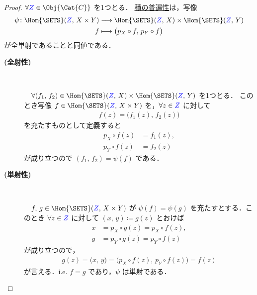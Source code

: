 \documentclass[geometry_main]{subfiles}
\begin{document}
\begin{proof}
	$\forall  \textcolor{blue}{Z} \in \Obj{\Cat{C}}$ を1つとる．
	\hyperref[def:product]{積の普遍性}は，写像
	\begin{align}
		\psi \colon \Hom{\SETS}(\textcolor{blue}{Z},\, X \times Y) &\lto \Hom{\SETS}(\textcolor{blue}{Z},\, X) \times \Hom{\SETS}(\textcolor{blue}{Z},\, Y) \\
		f &\lmto \bigl( p_X \circ f,\, p_Y \circ f \bigr) \label{eq:univ-product}
	\end{align}
	が全単射であることと同値である．
	\begin{description}
		\item[\textbf{(全射性)}] 　
		
		　$\forall (f_1,\, f_2) \in \Hom{\SETS}(\textcolor{blue}{Z},\, X) \times \Hom{\SETS}(\textcolor{blue}{Z},\, Y)$ を1つとる．
		このとき写像 $f \in \Hom{\SETS}(\textcolor{blue}{Z},\, X \times Y)$ を，$\forall z \in \textcolor{blue}{Z}$ に対して
		\begin{align}
			f(z) = \bigl( f_1(z),\, f_2(z) \bigr) 
		\end{align}
		を充たすものとして定義すると
		\begin{align}
			p_X \circ f (z) &= f_1(z),\\ 
			p_Y \circ f (z) &= f_2(z)
		\end{align}
		が成り立つので $(f_1,\, f_2) = \psi(f)$ である．
		\item[\textbf{(単射性)}] 　
		
		　$f,\, g \in \Hom{\SETS}(\textcolor{blue}{Z},\, X \times Y)$ が
		$\psi (f) = \psi(g)$ を充たすとする．このとき $\forall z \in \textcolor{blue}{Z}$ に対して
		$(x,\, y) \coloneqq g(z)$ とおけば
		\begin{align}
			x &= p_X \circ g (z) = p_X \circ f(z),\\ 
			y &= p_Y \circ g (z) = p_Y \circ f(z)
		\end{align}
		が成り立つので，
		\begin{align}
			g(z) = \bigl( x,\, y \bigr) = \bigl( p_X \circ f(z),\, p_Y \circ f(z) \bigr) = f(z)
		\end{align}
		が言える．i.e. $f = g$ であり，$\psi$ は単射である．
	\end{description}
\end{proof}
\end{document}
